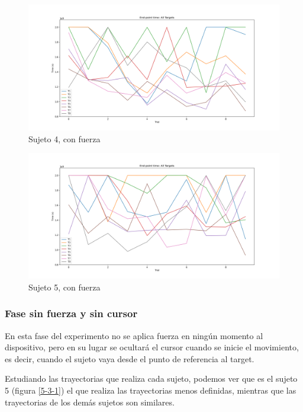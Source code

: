 \documentclass[a4paper,11pt, oneside]{book}
\begin{document}
\begin{figure}[H]
	\includegraphics[width=\linewidth]{sujeto4/force/evolution_time}
	\caption{Sujeto 4, con fuerza}
	\label{4-2-3}
\end{figure}
\begin{figure}[H]
	\includegraphics[width=\linewidth]{sujeto5/force/evolution_time}
	\caption{Sujeto 5, con fuerza}
	\label{5-2-3}
\end{figure}



\subsubsection{Fase sin fuerza y sin cursor}

En esta fase del experimento no se aplica fuerza en ningún momento al dispositivo, pero en su lugar se ocultará el cursor cuando se inicie el movimiento, es decir, cuando el sujeto vaya desde el punto de referencia al target.

Estudiando las trayectorias que realiza cada sujeto, podemos ver que es el sujeto 5 (figura \ref{5-3-1}) el que realiza las trayectorias menos definidas, mientras que las trayectorias de los demás sujetos son similares.
\end{document}
